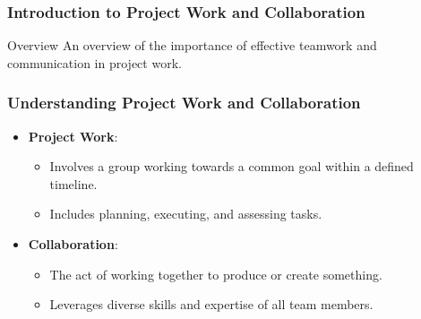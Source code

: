 \documentclass[aspectratio=169]{beamer}
\begin{document}
\frame{\titlepage}

\begin{frame}[fragile]
    \frametitle{Introduction to Project Work and Collaboration}
    \begin{block}{Overview}
        An overview of the importance of effective teamwork and communication in project work.
    \end{block}
\end{frame}

\begin{frame}[fragile]
    \frametitle{Understanding Project Work and Collaboration}
    \begin{itemize}
        \item \textbf{Project Work}:
        \begin{itemize}
            \item Involves a group working towards a common goal within a defined timeline.
            \item Includes planning, executing, and assessing tasks.
        \end{itemize}
        \item \textbf{Collaboration}:
        \begin{itemize}
            \item The act of working together to produce or create something.
            \item Leverages diverse skills and expertise of all team members.
        \end{itemize}
    \end{itemize}
\end{frame}
\end{document}
